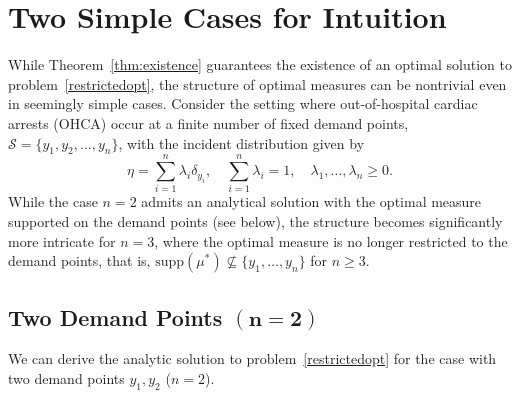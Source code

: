 \documentclass[stsy,sglanonrev]{informs4}
\begin{document}
\section{Two Simple Cases for Intuition}\label{sec:specialCases}
While Theorem~\ref{thm:existence} guarantees the existence of an optimal solution to problem~\eqref{restrictedopt}, the structure of optimal measures can be nontrivial even in seemingly simple cases. Consider the setting where out-of-hospital cardiac arrests (OHCA) occur at a finite number of fixed demand points, \(\mathcal{S} = \{y_1, y_2, \dots, y_n \}\), with the incident distribution given by
\begin{equation*}
    \eta = \sum_{i=1}^n \lambda_i \delta_{y_i}, \quad \sum_{i=1}^n \lambda_i = 1, \quad \lambda_1, \dots, \lambda_n \geq 0.
\end{equation*}
While the case \( n = 2 \) admits an analytical solution with the optimal measure supported on the demand points (see below), the structure becomes significantly more intricate for \( n = 3 \), where the optimal measure is no longer restricted to the demand points, that is, \( \mathrm{supp}(\mu^*) \not\subseteq \{y_1, \dots, y_n \} \) for $n \geq 3$. 







\subsection{Two Demand Points \texorpdfstring{$\mathbf{(n=2)}$}{(n=2)}}\label{sec:casen=2}
We can derive the analytic solution to problem~\eqref{restrictedopt} for the case with two demand points $y_1, y_2$ ($n=2$). 
        
        
\end{document}
